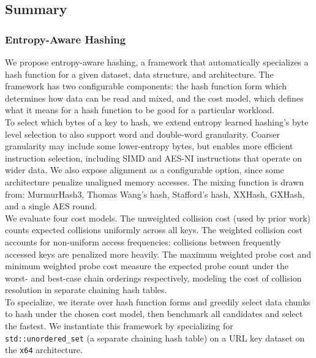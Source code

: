 \subsection{Summary}

\subsubsection{Entropy-Aware Hashing}

We propose entropy-aware hashing, a framework that automatically specializes a hash function for a given dataset, data structure, and architecture. The 
framework has two configurable components: the hash function form which determines how data can be read and mixed, and the cost model, which defines what it 
means for a hash function to be good for a particular workload. \\

\noindent
To select which bytes of a key to hash, we extend entropy learned hashing's byte level selection to also support word and double-word granularity. Coarser 
granularity may include some lower-entropy bytes, but enables more efficient instruction selection, including SIMD and AES-NI instructions that operate on wider
data. We also expose alignment as a configurable option, since some architecture penalize unaligned memory accesses. The mixing function is drawn from: 
MurmurHash3, Thomas Wang's hash, Stafford's hash, XXHash, GXHash, and a single AES round. \\

\noindent
We evaluate four cost models. The unweighted collision cost (used by prior work) counts expected collisions uniformly across all keys. The weighted collision 
cost accounts for non-uniform access frequencies: collisions between frequently accessed keys are penalized more heavily. The maximum weighted probe cost and 
minimum weighted probe cost measure the expected probe count under the worst- and best-case chain orderings respectively, modeling the cost of collision 
resolution in separate chaining hash tables. \\ 

\noindent
To specialize, we iterate over hash function forms and greedily select data chunks to hash under the chosen cost model, then benchmark all candidates and select
the fastest. We instantiate this framework by specializing for \texttt{std::unordered\_set} (a separate chaining hash table) on a URL key dataset on the 
\texttt{x64} architecture. \\

